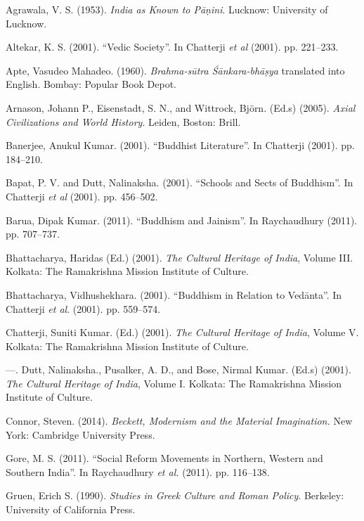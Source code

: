 \begin{thebibliography}{99}
\itemsep=1pt
 Agrawala, V. S. (1953). \textit{India as Known to Pāṇini}. Lucknow: University of Lucknow.

  Altekar, K. S. (2001). “Vedic Society”. In Chatterji \textit{et al} (2001). pp. 221–233.

  Apte, Vasudeo Mahadeo. (1960). \textit{Brahma-sūtra Śānkara-bhāṣya} translated into English. Bombay: Popular Book Depot.

  Arnason, Johann P., Eisenstadt, S. N., and Wittrock, Björn. (Ed.s) (2005). \textit{Axial Civilizations and World History}. Leiden, Boston: Brill.

  Banerjee, Anukul Kumar. (2001). “Buddhist Literature”. In Chatterji (2001). pp. 184–210.

  Bapat, P. V. and Dutt, Nalinaksha. (2001). “Schools and Sects of Buddhism”. In Chatterji \textit{et al }(2001). pp. 456–502.

  Barua, Dipak Kumar. (2011). “Buddhism and Jainism”. In Raychaudhury (2011). pp. 707–737.

  Bhattacharya, Haridas (Ed.) (2001). \textit{The Cultural Heritage of India}, Volume III. Kolkata: The Ramakrishna Mission Institute of Culture.

  Bhattacharya, Vidhushekhara. (2001). “Buddhism in Relation to Vedānta”. In Chatterji \textit{et al}. (2001). pp. 559–574.

  Chatterji, Suniti Kumar. (Ed.) (2001). \textit{The Cultural Heritage of India}, Volume V. Kolkata: The Ramakrishna Mission Institute of Culture.

  —. Dutt, Nalinaksha., Pusalker, A. D., and Bose, Nirmal Kumar. (Ed.s) (2001). \textit{The Cultural Heritage of India}, Volume I. Kolkata: The Ramakrishna Mission Institute of Culture.

  Connor, Steven. (2014). \textit{Beckett, Modernism and the Material Imagination. }New York: Cambridge University Press.

  Gore, M. S. (2011). “Social Reform Movements in Northern, Western and Southern India”. In Raychaudhury \textit{et al.} (2011). pp. 116–138.

  Gruen, Erich S. (1990). \textit{Studies in Greek Culture and Roman Policy}. Berkeley: University of California Press.


\end{thebibliography}
